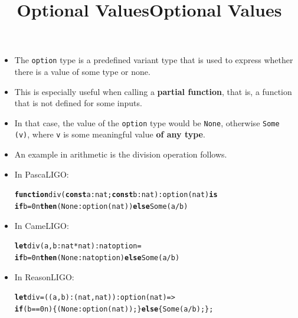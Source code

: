 \documentclass[wide]{slides}
\newcommand{\Kconst}[0]{\textbf{const}\xspace}
\newcommand{\Kelse}[0]{\textbf{else}\xspace}
\newcommand{\Kfunction}[0]{\textbf{function}\xspace}
\newcommand{\Kif}[0]{\textbf{if}\xspace}
\newcommand{\Kis}[0]{\textbf{is}\xspace}
\newcommand{\Kthen}[0]{\textbf{then}\xspace}
\newcommand{\Klet}[0]{\textbf{let}\xspace}
\begin{document}
\begin{slide}
  \title{Optional Values}

  \begin{itemize}

    \item The \texttt{option} type is a predefined variant type that
      is used to express whether there is a value of some type or
      none.

    \item This is especially useful when calling a \textbf{partial
      function}, that is, a function that is not defined for some
      inputs.

    \item In that case, the value of the \texttt{option} type
      would be \texttt{None}, otherwise \texttt{Some (v)}, where
      \texttt{v} is some meaningful value \textbf{of any type}.

  \end{itemize}

\end{slide}

\begin{slide}
  \title{Optional Values}

  \begin{itemize}

    \item An example in arithmetic is the division operation follows.

    \item In PascaLIGO:
      \begin{alltt}
\Kfunction div (\Kconst a : nat; \Kconst b : nat) : option (nat) \Kis
  \Kif b = 0n \Kthen (None: option (nat)) \Kelse Some (a/b)
      \end{alltt}

    \item In CameLIGO:
      \begin{alltt}
\Klet div (a, b : nat * nat) : nat option =
  \Kif b = 0n \Kthen (None: nat option) \Kelse Some (a/b)
      \end{alltt}

    \item In ReasonLIGO:
      \begin{alltt}
\Klet div = ((a, b) : (nat, nat)) : option (nat) =>
  \Kif (b == 0n) \{ (None: option (nat)); \} \Kelse \{ Some (a/b); \};
      \end{alltt}

  \end{itemize}

\end{slide}
\end{document}
